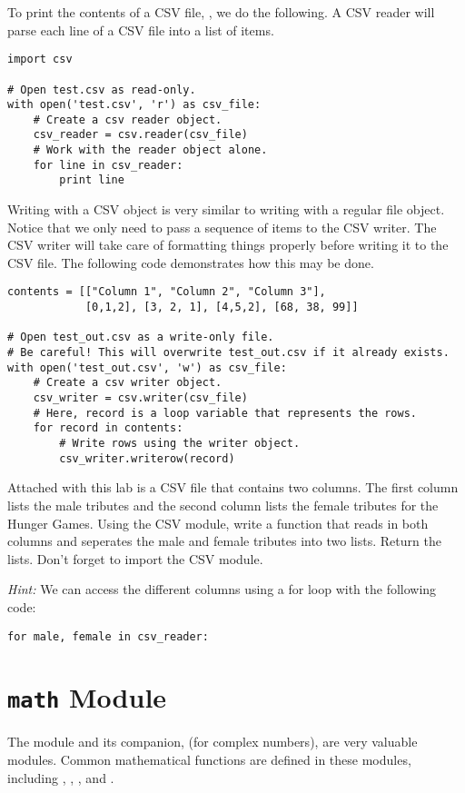 To print the contents of a CSV file, , we do the following.  A CSV reader will parse each line of a CSV file into a list of items.
\begin{lstlisting}
import csv

# Open test.csv as read-only.
with open('test.csv', 'r') as csv_file:
    # Create a csv reader object.
    csv_reader = csv.reader(csv_file)
    # Work with the reader object alone.
    for line in csv_reader:
        print line
\end{lstlisting}

Writing with a CSV  object is very similar to writing with a regular file object.  Notice that we only need to pass a sequence of items to the CSV writer.  The CSV writer will take care of formatting things properly before writing it to the CSV file.
The following code demonstrates how this may be done.
\begin{lstlisting}
contents = [["Column 1", "Column 2", "Column 3"],
            [0,1,2], [3, 2, 1], [4,5,2], [68, 38, 99]]

# Open test_out.csv as a write-only file.
# Be careful! This will overwrite test_out.csv if it already exists.
with open('test_out.csv', 'w') as csv_file:
    # Create a csv writer object.
    csv_writer = csv.writer(csv_file)
    # Here, record is a loop variable that represents the rows.
    for record in contents:
        # Write rows using the writer object.
        csv_writer.writerow(record)
\end{lstlisting}

\begin{problem}
Attached with this lab is a CSV file that contains two columns. The first column lists the male tributes and the second column lists the female tributes for the Hunger Games. Using the CSV module, write a function that reads in both columns and seperates the male and female tributes into two lists. Return the lists. Don't forget to import the CSV module.

\emph{Hint:} We can access the different columns using a for loop with the following code:
 
\begin{lstlisting}
for male, female in csv_reader:
\end{lstlisting}

\end{problem}

\section*{\texttt{math} Module}
The  module and its companion,  (for complex numbers), are very valuable modules.
Common mathematical functions are defined in these modules, including , , , and .

